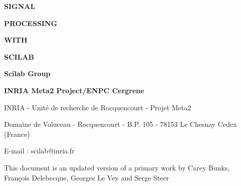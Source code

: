 



\pagestyle{empty}



\newpage

\vspace{8.cm}

{\Huge\bf  {SIGNAL}}

{\Huge\bf  {PROCESSING}}

{\Huge\bf  {WITH}}

{\Huge\bf  {SCILAB}}



\vspace{3.cm}

{\Huge\bf {Scilab Group}}

{\Large\bf
INRIA Meta2 Project/ENPC Cergrene}

\normalsize

\vspace{12.cm}

INRIA - Unit\'e de recherche de Rocquencourt - Projet Meta2

Domaine de Voluceau - Rocquencourt - B.P. 105 - 78153 Le Chesnay Cedex (France)

E-mail : scilab@inria.fr



\normalsize

\newpage


\bigskip
\bigskip

This document is an updated version of a primary work by
Carey Bunks, Fran\c{c}ois Delebecque, Georges Le Vey and Serge Steer



\tableofcontents

\pagestyle{headings}

